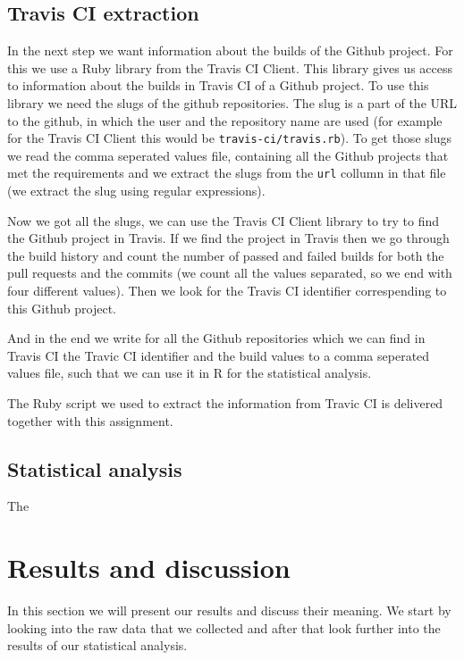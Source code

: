 \documentclass[a4paper,11pt]{article}
\begin{document}
		\subsection{Travis CI extraction}
			In the next step we want information about the builds of the Github project.
			For this we use a Ruby library from the Travis CI Client\cite{travis.rb}.
			This library gives us access to information about the builds in Travis CI of a Github project.
			To use this library we need the slugs of the github repositories.
			The slug is a part of the URL to the github, in which the user and the repository name are used (for example for the
			Travis CI Client this would be \texttt{travis-ci/travis.rb}).
			To get those slugs we read the comma seperated values file, containing all the Github projects that met the
			requirements and we extract the slugs from the \texttt{url} collumn in that file (we extract the slug using regular
			expressions).
			
			Now we got all the slugs, we can use the Travis CI Client library to try to find the Github project in Travis.
			If we find the project in Travis then we go through the build history and count the number of passed and failed
			builds for both the pull requests and the commits (we count all the values separated, so we end with four different
			values).
			Then we look for the Travis CI identifier correspending to this Github project.
			
			And in the end we write for all the Github repositories which we can find in Travis CI the Travic CI identifier and
			the build values to a comma seperated values file, such that we can use it in R for the statistical analysis.
			
			The Ruby script we used to extract the information from Travic CI is delivered together with this assignment.
	
		\subsection{Statistical analysis}
			The  
	
	\section{Results and discussion}
		In this section we will present our results and discuss their meaning. We start by looking into the raw data that we collected and after that look further into the results of our statistical analysis.
		
\end{document}
